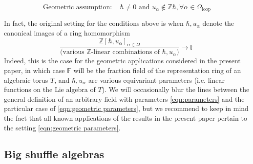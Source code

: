 \documentclass{amsart}
\def\BF{{\mathbb{F}}}
\def\BZ{{\mathbb{Z}}}
\def\edge{\Omega}
\begin{document}
\begin{equation}
\label{eqn:assumption geometric}
\text{Geometric assumption}: \quad \hbar \neq 0 \text{ and } u_{\alpha} \notin \BZ \hbar, \forall \alpha \in \Omega_{\text{loop}}
\end{equation}

\medskip 

\noindent In fact, the original setting for the conditions above is when $\hbar, u_\alpha$ denote the canonical images of a ring homomorphism
\begin{equation}
\label{eqn:geometric parameters}
\frac {\BZ[\hbar,u_\alpha]_{\alpha \in \edge}}{\Big(\text{various $\BZ$-linear combinations of }\hbar,u_\alpha\Big)} \rightarrow \BF 
\end{equation}
Indeed, this is the case for the geometric applications considered in the present paper, in which case $\BF$ will be the fraction field of the representation ring of an algebraic torus $T$, and $\hbar,u_\alpha$ are various equivariant parameters (i.e. linear functions on the Lie algebra of $T$). We will occasionally blur the lines between the general definition of an arbitrary field with parameters \eqref{eqn:parameters} and the particular case of \eqref{eqn:geometric parameters}, but we recommend to keep in mind the fact that all known applications of the results in the present paper pertain to the setting \eqref{eqn:geometric parameters}.

\medskip 

\subsection{Big shuffle algebras}
\label{sub:big shuffle}
\end{document}
